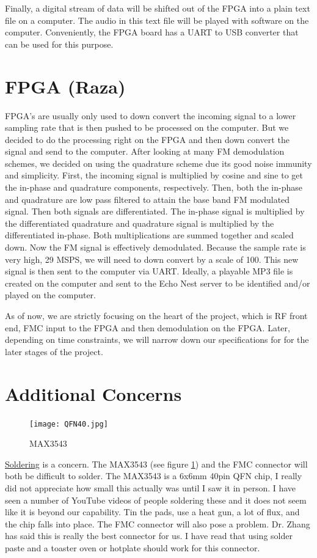 \documentclass[a4paper, 12pt]{article}
\begin{document}
Finally, a digital stream of data will be shifted out of the FPGA into a plain text file on a computer.  The audio in this text file will be played with software on the computer.  Conveniently, the FPGA board has a UART to USB converter that can be used for this purpose.

\section{FPGA (Raza)}
FPGA’s are usually only used to down convert the incoming signal to a lower sampling rate that is then pushed to be processed on the computer. But we decided to do the processing right on the FPGA and then down convert the signal and send to the computer. After looking at many FM demodulation schemes, we decided on using the quadrature scheme due its good noise immunity and simplicity. First, the incoming signal is multiplied by cosine and sine to get the in-phase and quadrature components, respectively. Then, both the in-phase and quadrature are low pass filtered to attain the base band FM modulated signal. Then both signals are differentiated. The in-phase signal is multiplied by the differentiated quadrature and quadrature signal is multiplied by the differentiated in-phase. Both multiplications are summed together and scaled down. Now the FM signal is effectively demodulated. Because the sample rate is very high, 29 MSPS, we will need to down convert by a scale of 100. This new signal is then sent to the computer via UART. Ideally, a playable MP3 file is created on the computer and sent to the Echo Nest server to be identified and/or played on the computer.

As of now, we are strictly focusing on the heart of the project, which is RF front end, FMC input to the FPGA and then demodulation on the FPGA. Later, depending on time constraints, we will narrow down our specifications for for the later stages of the project. 
\section{Additional Concerns}

\begin{figure}
\texttt{[image: QFN40.jpg]}
\caption{MAX3543}
\label{fig:qfn40}
\end{figure}

\underline{Soldering} is a concern.  The MAX3543 (see figure \ref{fig:qfn40}) and the FMC connector will both be difficult to solder.  The MAX3543 is a 6x6mm 40pin QFN chip, I really did not appreciate how small this actually was until I saw it in person.  I have seen a number of YouTube videos of people soldering these and it does not seem like it is beyond our capability.  Tin the pads, use a heat gun, a lot of flux, and the chip falls into place.  The FMC connector will also pose a problem.  Dr. Zhang has said this is really the best connector for us.  I have read that using solder paste and a toaster oven or hotplate should work for this connector.
\end{document}
